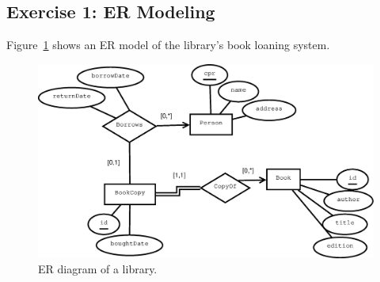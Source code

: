 \subsection{Exercise 1: ER Modeling}
Figure~\ref{fig:ss3-ex1-er} shows an ER model of the library's book loaning system.

\begin{figure}[h]
  \centering
  \includegraphics[width=\linewidth]{3-12.03.14/exercise1.eps}
  \caption{ER diagram of a library.}\label{fig:ss3-ex1-er}
\end{figure}
